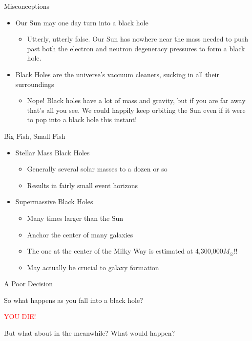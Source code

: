 \documentclass[pdf, aspectratio=169]{beamer}
\begin{document}
\begin{frame}{Misconceptions}
  \begin{itemize}
	\item Our Sun may one day turn into a black hole
	  \begin{itemize}
		\item<2-> Utterly, utterly false. Our Sun has nowhere near the mass needed to push past both the electron and neutron degeneracy pressures to form a black hole.
	  \end{itemize}
	\item Black Holes are the universe's vaccuum cleaners, sucking in all their surroundings
	  \begin{itemize}
		\item<3-> Nope! Black holes have a lot of mass and gravity, but if you are far away that's all you see. We could happily keep orbiting the Sun even if it were to pop into a black hole this instant!
	  \end{itemize}
  \end{itemize}
\end{frame}

\begin{frame}{Big Fish, Small Fish}
  \begin{itemize}
	\item Stellar Mass Black Holes
	  \begin{itemize}
		\item Generally several solar masses to a dozen or so
		\item Results in fairly small event horizons
	  \end{itemize}
	\item Supermassive Black Holes
	  \begin{itemize}
		\item Many times larger than the Sun
		\item Anchor the center of many galaxies
		\item The one at the center of the Milky Way is estimated at 4,300,000$M_\odot$!!
		\item May actually be crucial to galaxy formation
	  \end{itemize}
  \end{itemize}
\end{frame}

\begin{frame}{A Poor Decision}
  \begin{center}
	So what happens as you fall into a black hole?\vspace{1cm}

  \pause
	\textcolor{Red}{\Huge YOU DIE!}
  \pause

  \vspace{1cm}
  But what about in the meanwhile? What would happen?
  \end{center}
\end{frame}
\end{document}
